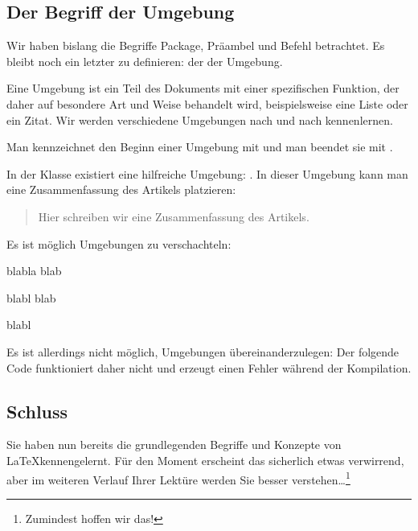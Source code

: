 \subsection{Der Begriff der Umgebung}

Wir haben bislang die Begriffe Package, Präambel und Befehl betrachtet. Es bleibt noch ein letzter zu definieren: der der Umgebung.

Eine Umgebung ist ein Teil des Dokuments mit einer spezifischen Funktion, der daher auf besondere Art und Weise behandelt wird, beispielsweise eine Liste oder ein Zitat. Wir werden verschiedene Umgebungen nach und nach kennenlernen.

Man kennzeichnet den Beginn einer Umgebung  mit  und man beendet sie mit .

In der Klasse  existiert eine hilfreiche Umgebung: . In dieser Umgebung kann man eine Zusammenfassung des Artikels platzieren:

\begin{latexcode}
\begin{abstract}
Hier schreiben wir eine Zusammenfassung des Artikels. 
\end{abstract}
\end{latexcode}

Es ist möglich Umgebungen zu verschachteln:

\begin{latexcode}
\begin{1}
blabla blab
\begin{2}
blabl blab
\end{2}
blabl
\end{1}
\end{latexcode}

Es ist allerdings nicht möglich, Umgebungen übereinanderzulegen: Der folgende Code funktioniert daher nicht und erzeugt einen Fehler während der Kompilation.


\subsection{Schluss}

Sie haben nun bereits die grundlegenden Begriffe und Konzepte von \LaTeX kennengelernt. Für den Moment erscheint das sicherlich etwas verwirrend, aber im weiteren Verlauf Ihrer Lektüre werden Sie besser verstehen\ldots\footnote{Zumindest hoffen wir das!}

